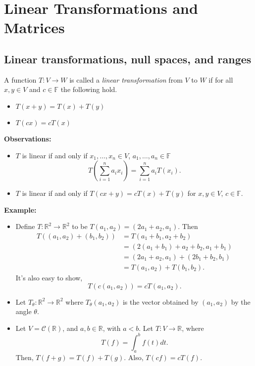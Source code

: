 \documentclass[12pt]{article}
\newenvironment{definition}[2][Definition]{\begin{trivlist}
\item[\hskip \labelsep {\bfseries #1}\hskip \labelsep {\bfseries #2}]}{\end{trivlist}}
\begin{document}
\section{Linear Transformations and Matrices}

\subsection{Linear transformations, null spaces, and ranges}

\begin{definition}{1}
A function $T : V \to W$ is called a \textit{linear transformation} from $V$ to $W$ if for all $x,y \in V$ and $c \in \mathbb{F}$ the following hold.

\begin{itemize}
    \item $T(x + y) = T(x) + T(y)$
    \item $T(cx) = cT(x)$
\end{itemize}
\end{definition}

\noindent \textbf{Observations:}
\begin{itemize}
    \item $T$ is linear if and only if $x_1, \dots, x_n \in V$, $a_1, \dots, a_n \in \mathbb{F}$ $$T \left( \sum_{i = 1}^n a_ix_i \right) = \sum_{i = 1}^n a_iT(x_i).$$
    \item $T$ is linear if and only if $T(cx + y) = cT(x) + T(y)$ for $x,y \in V$, $c \in \mathbb{F}$.
\end{itemize}

\noindent\textbf{Example:} 
\begin{itemize}
    \item[(1)] Define $T : \mathbb{R}^2 \to \mathbb{R}^2$ to be $T(a_1, a_2) = (2a_1 + a_2, a_1)$. Then \begin{align*}
    T((a_1,a_2) + (b_1, b_2)) &= T(a_1 + b_1, a_2 + b_2) \\
    &= (2(a_1 + b_1) + a_2 + b_2, a_1 + b_1) \\
    &= (2a_1 + a_2, a_1) + (2b_1 + b_2, b_1) \\
    &= T(a_1,a_2) + T(b_1,b_2).
    \end{align*}
    It's also easy to show, $$T(c(a_1,a_2)) = cT(a_1,a_2).$$
    
    \item[(2)] Let $T_\theta : \mathbb{R}^2 \to \mathbb{R}^2$ where $T_\theta(a_1,a_2)$ is the vector obtained by $(a_1,a_2)$ by the angle $\theta$.
    
    \item[(3)] Let $V = \mathcal{C}(\mathbb{R})$, and $a, b \in \mathbb{R}$, with $a < b$. Let $T : V \to \mathbb{R}$, where $$T(f) = \int_a^bf(t)dt.$$ Then, $T(f + g) = T(f) + T(g)$. Also, $T(cf) = cT(f)$.
\end{itemize}
\end{document}
